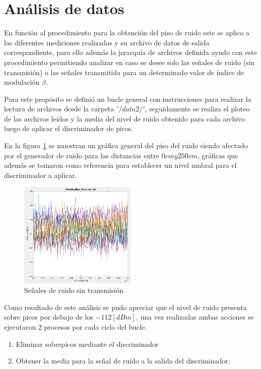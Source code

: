 \documentclass[conference]{IEEEtran}
\begin{document}
	
	\section{Análisis de datos}
	
	En función al procedimiento para la obtención del piso de ruido este se aplico a las diferentes mediciones realizadas y su archivo de datos de salida correspondiente, para ello además la jerarquía de archivos definida ayudo con este procedimiento permitiendo analizar en caso se desee solo las señales de ruido (sin transmisión) o las señales transmitida para un determinado valor de índice de modulación $\beta$.
	
	Para este propósito se definió un bucle general con instrucciones para realizar la lectura de archivos desde la carpeta $'/data2/'$, seguidamente se realiza el ploteo de las archivos leídos y la media del nivel de ruido obtenido para cada archivo luego de aplicar el discriminador de picos.
	
	En la figura \ref{fig:seniales-ruido} se muestran un gráfica general del piso del ruido siendo afectado por el generador de ruido para las distancias entre $0cm y 250cm$, gráficas que además se tomaron como referencia para establecer un nivel umbral para el discriminador a aplicar.
	
	\begin{figure}[h]
		\centering
		\includegraphics[width=0.5\textwidth]{media/seniales-ruido}
		\caption{Señales de ruido sin transmisión}
		\label{fig:seniales-ruido}
	\end{figure}
	
	Como resultado de este análisis se pudo apreciar que el nivel de ruido presenta sobre picos por debajo de los $-112 [dBm]$, una vez realizadas ambas acciones se ejecutaron 2 procesos por cada ciclo del bucle.
	
	\begin{enumerate}
		\item Eliminar sobrepicos mediante el discriminador
		\item Obtener la media para la señal de ruido a la salida del discriminador.
	\end{enumerate}
	
\end{document}

